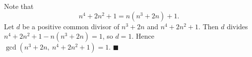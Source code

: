 Note that
\[n^4+2n^2+1=n\left(n^3+2n\right)+1.\]
Let $d$ be a positive common divisor of $n^3+2n$ and $n^4+2n^2+1$. Then $d$ divides $n^4+2n^2+1-n\left(n^3+2n\right)=1$, so $d=1$. Hence $\gcd\left(n^3+2n,\ n^4+2n^2+1\right)=1$. $\blacksquare$
